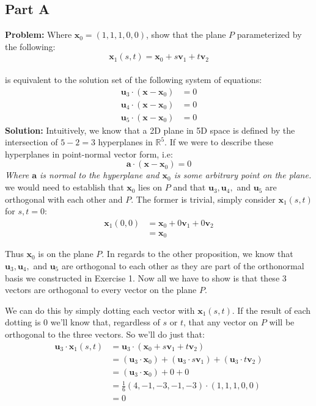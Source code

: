 \documentclass{article}
\begin{document}
\subsection*{Part A}
\textbf{Problem:} Where $\mathbf x_0=(1,1,1,0,0)$, show that the plane $P$ parameterized by the following:
$$\mathbf x_1(s,t)=\mathbf x_0+s\mathbf v_1+t\mathbf v_2$$
\\
is equivalent to the solution set of the following system of equations:
\begin{align*}
  \mathbf u_3\cdot(\mathbf x-\mathbf x_0) &= 0\\
  \mathbf u_4\cdot(\mathbf x-\mathbf x_0) &= 0\\
  \mathbf u_5\cdot(\mathbf x-\mathbf x_0) &= 0
\end{align*}
\textbf{Solution:} Intuitively, we know that a 2D plane in 5D space is defined by the intersection of $5-2=3$ hyperplanes in $\mathbb R^5$. If we were to describe these hyperplanes in point-normal vector form, i.e:
$$\mathbf a\cdot (\mathbf x-\mathbf x_0)=0$$
\textit{Where $\mathbf a$ is normal to the hyperplane and $\mathbf x_0$ is some arbitrary point on the plane.}
\\

we would need to establish that $\mathbf x_0$ lies on $P$ and that $\mathbf u_3,\mathbf u_4,$ and $\mathbf u_5$ are orthogonal with each other and $P$. The former is trivial, simply consider $\mathbf x_1(s,t)$ for $s,t=0$:
\begin{align*}
  \mathbf x_1(0,0)&=\mathbf x_0+0\mathbf v_1+0\mathbf v_2\\
  &=\mathbf x_0
\end{align*}

Thus $\mathbf x_0$ is on the plane $P$. In regards to the other proposition, we know that $\mathbf u_3,\mathbf u_4,$ and $\mathbf u_5$ are orthogonal to each other as they are part of the orthonormal basis we constructed in Exercise 1. Now all we have to show is that these 3 vectors are orthogonal to every vector on the plane $P$.

We can do this by simply dotting each vector with $\mathbf x_1(s,t)$. If the result of each dotting is 0 we'll know that, regardless of $s$ or $t$, that any vector on $P$ will be orthogonal to the three vectors. So we'll do just that:
\begin{align*}
  \mathbf u_3\cdot\mathbf x_1(s,t)&=\mathbf u_3\cdot(\mathbf x_0+s\mathbf v_1+t\mathbf v_2)\\
  &=(\mathbf u_3\cdot\mathbf x_0)+(\mathbf u_3\cdot s\mathbf v_1)+(\mathbf u_3\cdot t\mathbf v_2)\tag{distr. of dot prod.}\\
  &=(\mathbf u_3\cdot\mathbf x_0)+0+0\tag{consequence of Gram-Schmidt}\\
  &=\frac{1}{6}(4,-1,-3,-1,-3)\cdot(1,1,1,0,0)\\
  &=0
\end{align*}
\end{document}
